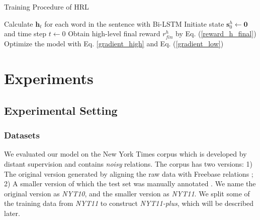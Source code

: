 \documentclass[letterpaper]{article} %
\theoremstyle{definition}
\begin{document}
\begin{algorithm}[!htb]
\small
\caption{Training Procedure of HRL}
\label{training}
Calculate $\mathbf{h}_t$ for each word in the sentence with Bi-LSTM \;
Initiate state $\mathbf{s}_0^h \leftarrow \mathbf{0}$ and time step $t \leftarrow 0$\;
Obtain high-level final reward $r_{fin}^h$ by Eq. (\ref{reward_h_final})\;
Optimize the model with Eq. \ref{gradient_high} and Eq. (\ref{gradient_low})\;
\end{algorithm}

\section{Experiments}

\subsection{Experimental Setting}
\subsubsection{Datasets}
We evaluated our model on the New York Times corpus which is developed by distant supervision and contains \textit{noisy} relations. The corpus has two versions: 1) The original version generated by aligning the raw data with Freebase relations \cite{riedel2010modeling}; 2) A smaller version of which the test set was manually annotated \cite{hoffmann2011knowledge}. We name the original version as {\it NYT10}, and the smaller version as {\it NYT11}. We split some of the training data from \textit{NYT11} to construct \textit{NYT11-plus}, which will be described later.


\end{document}

